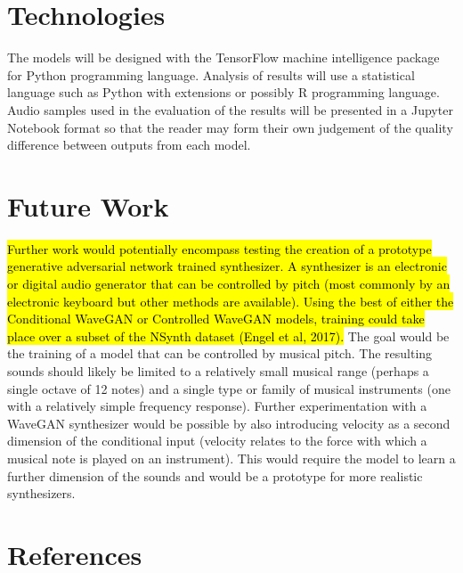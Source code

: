 \documentclass[titlepage]{article}
\begin{document}
\section{Technologies}

The models will be designed with the TensorFlow machine intelligence package for Python programming language.
Analysis of results will use a statistical language such as Python with extensions or possibly R programming language.
Audio samples used in the evaluation of the results will be presented in a Jupyter Notebook format so that the reader may form their own judgement of the quality difference between outputs from each model.

\section{Future Work}

\hl{
Further work would potentially encompass testing the creation of a prototype generative adversarial network trained synthesizer.
A synthesizer is an electronic or digital audio generator that can be controlled by pitch (most commonly by an electronic keyboard but other methods are available).
Using the best of either the Conditional WaveGAN or Controlled WaveGAN models, training could take place over a subset of the NSynth dataset (Engel et al, 2017).
}
\newline
\newline
The goal would be the training of a model that can be controlled by musical pitch.
The resulting sounds should likely be limited to a relatively small musical range (perhaps a single octave of 12 notes) and a single type or family of musical instruments (one with a relatively simple frequency response).
\newline
\newline
Further experimentation with a WaveGAN synthesizer would be possible by also introducing velocity as a second dimension of the conditional input (velocity relates to the force with which a musical note is played on an instrument).
This would require the model to learn a further dimension of the sounds and would be a prototype for more realistic synthesizers.

\newpage
\section{References}
\end{document}
